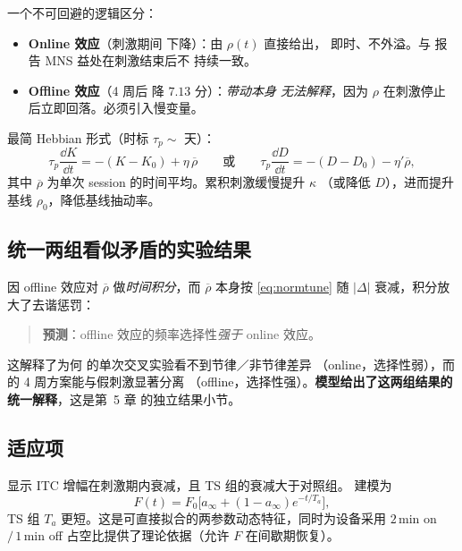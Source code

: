 一个不可回避的逻辑区分：
%
\begin{itemize}[leftmargin=2em,itemsep=2pt]
\item \textbf{Online 效应}（刺激期间 \TPM{} 下降）：由 $\rho(t)$ 直接给出，
      即时、不外溢。与 \citet{Iverson2023a} 报告 MNS 益处在刺激结束后不
      持续一致。
\item \textbf{Offline 效应}（4 周后 \YGTSS{} 降 $7.13$ 分）：\emph{带动本身
      无法解释}，因为 $\rho$ 在刺激停止后立即回落。必须引入慢变量。
\end{itemize}

最简 Hebbian 形式（时标 $\tau_p\sim$ 天）：
%
\begin{equation}\label{eq:hebb}
\tau_p\frac{\dd K}{\dd t}=-(K-K_0)+\eta\,\overline{\rho}
\qquad\text{或}\qquad
\tau_p\frac{\dd D}{\dd t}=-(D-D_0)-\eta'\overline{\rho} ,
\end{equation}
%
其中 $\overline{\rho}$ 为单次 session 的时间平均。累积刺激缓慢提升 $\kappa$
（或降低 $D$），进而提升基线 $\rho_0$，降低基线抽动率。

\subsection{统一两组看似矛盾的实验结果}
\label{sec:unifyexp}

因 offline 效应对 $\overline{\rho}$ 做\emph{时间积分}，而 $\overline{\rho}$
本身按 \cref{eq:normtune} 随 $|\Delta|$ 衰减，积分放大了去谐惩罚：
%
\begin{quote}
\textbf{预测}：offline 效应的频率选择性\emph{强于} online 效应。
\end{quote}
%
这解释了为何 \citet{Iverson2023a} 的单次交叉实验看不到节律／非节律差异
（online，选择性弱），而 \citet{Maiquez2023} 的 4 周方案能与假刺激显著分离
（offline，选择性强）。\textbf{模型给出了这两组结果的统一解释}，这是第~5 章
的独立结果小节。

\subsection{适应项}
\label{sec:adapt}

\citet{Morera2026} 显示 ITC 增幅在刺激期内衰减，且 TS 组的衰减大于对照组。
建模为
%
\begin{equation}\label{eq:adapt}
F(t)=F_0\bigl[a_\infty+(1-a_\infty)e^{-t/T_a}\bigr],
\end{equation}
%
TS 组 $T_a$ 更短。这是可直接拟合的两参数动态特征，同时为设备采用
$2\,$min on $/\,1\,$min off 占空比提供了理论依据（允许 $F$ 在间歇期恢复）。

